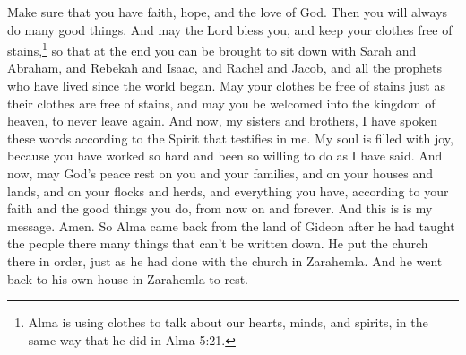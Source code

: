 Make sure that you have faith, hope, and the love of God. Then you will always do many good things.
\bverse \iffalse And may the Lord bless you, and keep your garments spotless, that ye may at last be brought to sit down with Abraham, Isaac, and Jacob, and the holy prophets who have been ever since the world began, having your garments spotless even as their garments are spotless, in the kingdom of heaven to go no more out. \fi
And may the Lord bless you, and keep your clothes free of stains,\footnote{Alma is using clothes to talk about our hearts, minds, and spirits, in the same way that he did in Alma 5:21.} so that at the end you can be brought to sit down with Sarah and Abraham, and Rebekah and Isaac, and Rachel and Jacob, and all the prophets who have lived since the world began. May your clothes be free of stains just as their clothes are free of stains, and may you be welcomed into the kingdom of heaven, to never leave again.
\bverse \iffalse And now my beloved brethren, I have spoken these words unto you according to the Spirit which testifieth in me; and my soul doth exceedingly rejoice, because of the exceeding diligence and heed which ye have given unto my word. \fi
And now, my sisters and brothers, I have spoken these words according to the Spirit that testifies in me. My soul is filled with joy, because you have worked so hard and been so willing to do as I have said.
\bverse \iffalse And now, may the peace of God rest upon you, and upon your houses and lands, and upon your flocks and herds, and all that you possess, your women and your children, according to your faith and good works, from this time forth and forever. And thus I have spoken. Amen. \fi
And now, may God's peace rest on you and your families, and on your houses and lands, and on your flocks and herds, and everything you have, according to your faith and the good things you do, from now on and forever. And this is is my message. Amen.
\bchapter
\bverse \iffalse And now it came to pass that Alma returned from the land of Gideon, after having taught the people of Gideon many things which cannot be written, having established the order of the church, according as he had before done in the land of Zarahemla, yea, he returned to his own house at Zarahemla to rest himself from the labors which he had performed. \fi
So Alma came back from the land of Gideon after he had taught the people there many things that can't be written down. He put the church there in order, just as he had done with the church in Zarahemla. And he went back to his own house in Zarahemla to rest.
